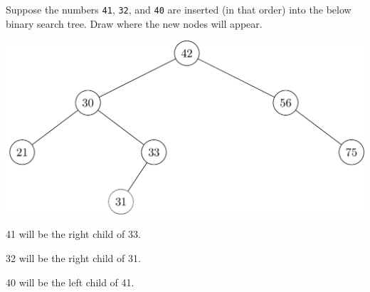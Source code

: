 \begin{prob}
    Suppose the numbers
        \texttt{41},
        \texttt{32},
        and
        \texttt{40}
    are inserted (in that order) into the below binary search tree. Draw where
    the new nodes will appear.

    \includegraphics{./bst.png}

    \begin{soln}
        41 will be the right child of 33.

        32 will be the right child of 31.

        40 will be the left child of 41.


    \end{soln}

\end{prob}
